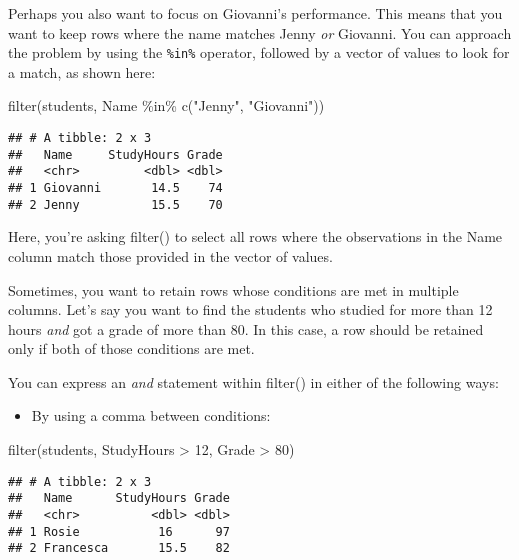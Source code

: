 \documentclass[
]{article}
\newenvironment{Shaded}{\begin{snugshade}}{\end{snugshade}}
\newcommand{\DecValTok}[1]{\textcolor[rgb]{0.00,0.00,0.81}{#1}}
\newcommand{\FunctionTok}[1]{\textcolor[rgb]{0.00,0.00,0.00}{#1}}
\newcommand{\NormalTok}[1]{#1}
\newcommand{\SpecialCharTok}[1]{\textcolor[rgb]{0.00,0.00,0.00}{#1}}
\newcommand{\StringTok}[1]{\textcolor[rgb]{0.31,0.60,0.02}{#1}}
\providecommand{\tightlist}{%
  \setlength{\itemsep}{0pt}\setlength{\parskip}{0pt}}
\begin{document}
Perhaps you also want to focus on Giovanni's performance. This means
that you want to keep rows where the name matches Jenny \emph{or}
Giovanni. You can approach the problem by using the \texttt{\%in\%}
operator, followed by a vector of values to look for a match, as shown
here:

\begin{Shaded}
\begin{Highlighting}[]
\FunctionTok{filter}\NormalTok{(students, Name }\SpecialCharTok{\%in\%} \FunctionTok{c}\NormalTok{(}\StringTok{"Jenny"}\NormalTok{, }\StringTok{"Giovanni"}\NormalTok{))}
\end{Highlighting}
\end{Shaded}

\begin{verbatim}
## # A tibble: 2 x 3
##   Name     StudyHours Grade
##   <chr>         <dbl> <dbl>
## 1 Giovanni       14.5    74
## 2 Jenny          15.5    70
\end{verbatim}

Here, you're asking filter() to select all rows where the observations
in the Name column match those provided in the vector of values.

Sometimes, you want to retain rows whose conditions are met in multiple
columns. Let's say you want to find the students who studied for more
than 12 hours \emph{and} got a grade of more than 80. In this case, a
row should be retained only if both of those conditions are met.

You can express an \emph{and} statement within filter() in either of the
following ways:

\begin{itemize}
\tightlist
\item
  By using a comma between conditions:
\end{itemize}

\begin{Shaded}
\begin{Highlighting}[]
\FunctionTok{filter}\NormalTok{(students, StudyHours }\SpecialCharTok{\textgreater{}} \DecValTok{12}\NormalTok{, Grade }\SpecialCharTok{\textgreater{}} \DecValTok{80}\NormalTok{)}
\end{Highlighting}
\end{Shaded}

\begin{verbatim}
## # A tibble: 2 x 3
##   Name      StudyHours Grade
##   <chr>          <dbl> <dbl>
## 1 Rosie           16      97
## 2 Francesca       15.5    82
\end{verbatim}
\end{document}
